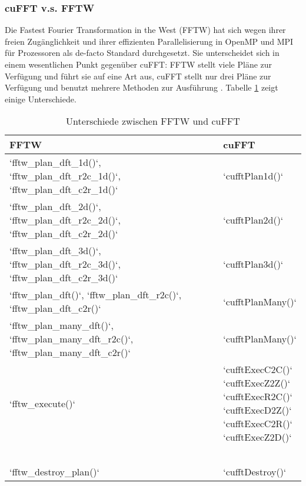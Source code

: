 		 	\subsubsection{cuFFT v.s. FFTW}\label{fftw}
		 	Die Fastest Fourier Transformation in the West (FFTW) hat sich wegen ihrer freien Zugänglichkeit und ihrer effizienten Parallelisierung in OpenMP und MPI für Prozessoren als de-facto Standard durchgesetzt. Sie unterscheidet sich in einem wesentlichen Punkt gegenüber cuFFT: FFTW stellt viele Pläne zur Verfügung und führt sie auf eine Art aus, cuFFT stellt nur drei Pläne zur Verfügung und benutzt mehrere Methoden zur Ausführung \autocite{FFTW05}. Tabelle \ref{tab6:fftw} zeigt einige Unterschiede.
		 	\begin{table}[h]
		 	\centering
		 	\begin{tabular}{|l|l|}
		 		\hline
		 		FFTW & cuFFT \\ \hline\hline
		 		\li`fftw_plan_dft_1d()`, \li`fftw_plan_dft_r2c_1d()`, \li`fftw_plan_dft_c2r_1d()` & \li`cufftPlan1d()` \\ \hline
		 		\li`fftw_plan_dft_2d()`, \li`fftw_plan_dft_r2c_2d()`, \li`fftw_plan_dft_c2r_2d()` & \li`cufftPlan2d()` \\ \hline
		 		\li`fftw_plan_dft_3d()`, \li`fftw_plan_dft_r2c_3d()`, \li`fftw_plan_dft_c2r_3d()` & \li`cufftPlan3d()` \\ \hline
		 		\li`fftw_plan_dft()`, \li`fftw_plan_dft_r2c()`, \li`fftw_plan_dft_c2r()` & \li`cufftPlanMany()` \\ \hline
		 		\li`fftw_plan_many_dft()`, \li`fftw_plan_many_dft_r2c()`, \li`fftw_plan_many_dft_c2r()` & \li`cufftPlanMany()` \\ \hline
		 		\li`fftw_execute()` & \multirowcell{6}{\li`cufftExecC2C()`\\ \li`cufftExecZ2Z()`\\ \li`cufftExecR2C()`\\ \li`cufftExecD2Z()`\\ \li`cufftExecC2R()`\\ \li`cufftExecZ2D()`} \\
		 		& \\
		 		& \\
		 		& \\
		 		& \\
		 		& \\ \hline
		 		\li`fftw_destroy_plan()` & \li`cufftDestroy()` \\ \hline\bottomrule
		 	\end{tabular}
		 	\caption[cuFFT v.s. FFTW]{Unterschiede zwischen FFTW und cuFFT}
		 	\label{tab6:fftw}
		 	\end{table}
		 	
